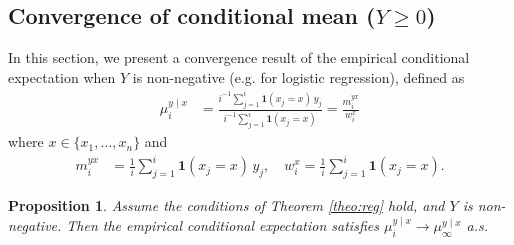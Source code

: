 \documentclass[11pt,a4paper]{article}
\theoremstyle{plain}
\newtheorem{prop}{Proposition}
\theoremstyle{remark}
\theoremstyle{remark}
\begin{document}
\subsection{Convergence of conditional mean ($Y \geq 0$)}\label{sec:app_condit}
In this section, we present a convergence result of the empirical conditional expectation when $Y$ is non-negative (e.g. for logistic regression),  defined as 
\begin{align*}
{\mu}_i^{y \mid x} &= \frac{i^{-1}\sum_{j = 1}^{i}\mathbf{1}(x_j = x)\,  y_j}{i^{-1}\sum_{j = 1}^i \mathbf{1}(x_j = x)} = \frac{m_i^{yx}}{w_i^x}
\end{align*}
where $x \in \{x_1,\ldots,x_n\}$
and 
\begin{align*}
    {m}_i^{yx} &= \frac{1}{i}\sum_{j = 1}^i \mathbf{1}(x_j = x) \,y_j,
         \quad w_i^x = \frac{1}{i}\sum_{j = 1}^i \mathbf{1}(x_j = x).
\end{align*}
\begin{prop}\label{prop:cond_mean}
Assume the conditions of Theorem \ref{theo:reg} hold, and $Y$ is non-negative. Then the empirical conditional expectation satisfies $\mu_i^{y \mid x} \to \mu_\infty^{y \mid x}$ a.s.
\end{prop}
\end{document}
